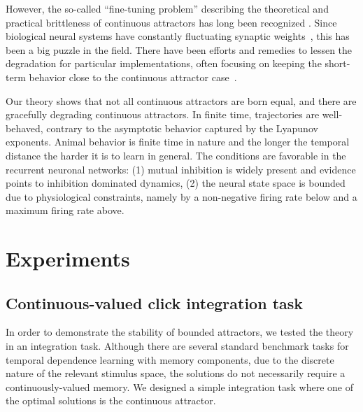 \documentclass{article} %
\newcounter{ct}
\theoremstyle{definition}
\theoremstyle{remark}
\renewcommand{\cite}{\citep}
\begin{document}
However, the so-called ``fine-tuning problem'' describing the theoretical and practical brittleness of continuous attractors has long been recognized \citep{seung1998,Park2023a}.
Since biological neural systems have constantly fluctuating synaptic weights~\cite{shimizu2021}, this has been a big puzzle in the field.
There have been efforts and remedies to lessen the degradation for particular implementations, often focusing on keeping the short-term behavior close to the continuous attractor case~\cite{Lim2012,Lim2013,Boerlin2013,Koulakov2002,Renart2003}.

Our theory shows that not all continuous attractors are born equal, and there are gracefully degrading continuous attractors.
In finite time, trajectories are well-behaved, contrary to the asymptotic behavior captured by the Lyapunov exponents.
Animal behavior is finite time in nature and the longer the temporal distance the harder it is to learn in general.
The conditions are favorable in the recurrent neuronal networks: (1) mutual inhibition is widely present and evidence points to inhibition dominated dynamics,
(2) the neural state space is bounded due to physiological constraints, namely by a non-negative firing rate below and a maximum firing rate above.


\section{Experiments}



\subsection{Continuous-valued click integration task}\label{sec:task:continuous-clicks}
In order to demonstrate the stability of bounded attractors, we tested the theory in an integration task.
Although there are several standard benchmark tasks for temporal dependence learning with memory components,
due to the discrete nature of the relevant stimulus space, the solutions do not necessarily require a continuously-valued memory.
We designed a simple integration task where one of the optimal solutions is the continuous attractor.
\end{document}
